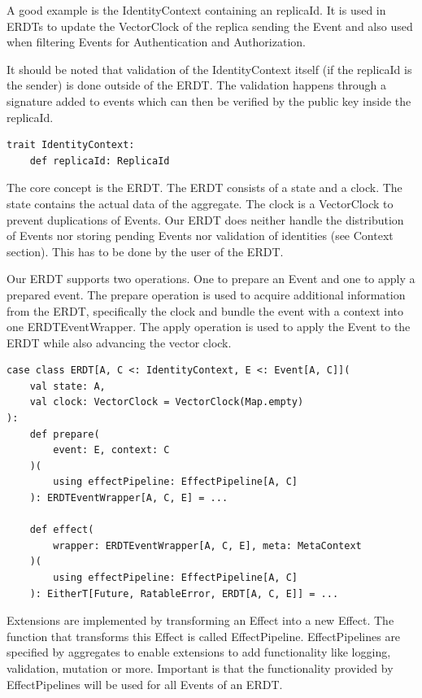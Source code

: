 \documentclass[
	ngerman,
	ruledheaders=section,   %
	class=report,		    %
	thesis={type=bachelor}, %
	accentcolor=9c,			%
	custommargins=true,    %
	marginpar=false,        %
	parskip=half-,          %
	fontsize=11pt,          %
]{tudapub}
\begin{document}
A good example is the IdentityContext containing an replicaId. It is used in ERDTs to update the VectorClock of the replica sending the Event and also used when filtering Events for Authentication and Authorization.

It should be noted that validation of the IdentityContext itself (if the replicaId is the sender) is done outside of the ERDT. The validation happens through a signature added to events which can then be verified by the public key inside the replicaId.

\begin{lstlisting}
trait IdentityContext:
	def replicaId: ReplicaId
\end{lstlisting}

The core concept is the ERDT. The ERDT consists of a state and a clock. The state contains the actual data of the aggregate. The clock is a VectorClock to prevent duplications of Events. Our ERDT does neither handle the distribution of Events nor storing pending Events nor validation of identities (see Context section). This has to be done by the user of the ERDT.

Our ERDT supports two operations. One to prepare an Event and one to apply a prepared event. The prepare operation is used to acquire additional information from the ERDT, specifically the clock and bundle the event with a context into one ERDTEventWrapper. The apply operation is used to apply the Event to the ERDT while also advancing the vector clock.

\begin{lstlisting}
case class ERDT[A, C <: IdentityContext, E <: Event[A, C]](
	val state: A,
	val clock: VectorClock = VectorClock(Map.empty)
):
	def prepare(
		event: E, context: C
	)(
		using effectPipeline: EffectPipeline[A, C]
	): ERDTEventWrapper[A, C, E] = ...

	def effect(
		wrapper: ERDTEventWrapper[A, C, E], meta: MetaContext
	)(
		using effectPipeline: EffectPipeline[A, C]
	): EitherT[Future, RatableError, ERDT[A, C, E]] = ...
\end{lstlisting}

Extensions are implemented by transforming an Effect into a new Effect. The function that transforms this Effect is called EffectPipeline. EffectPipelines are specified by aggregates to enable extensions to add functionality like logging, validation, mutation or more. Important is that the functionality provided by EffectPipelines will be used for all Events of an ERDT. 
\end{document}
